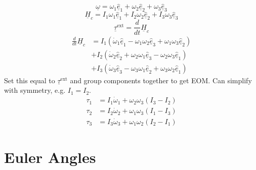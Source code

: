 \documentclass[letterpaper,twocolumn,notitlepage]{article}
\begin{document}
  \begin{equation*}
    \underline{\omega}=\omega_{1}\hat{\underline{e}}_{1}+\omega_{2}\hat{\underline{e}}_{2}+\omega_{3}\hat{\underline{e}}_{3}
  \end{equation*}
  \begin{equation*}
    \underline{H}_{c}=I_{1}\omega_{1}\hat{\underline{e}}_{1}+I_{2}\omega_{2}\hat{\underline{e}}_{2}+I_{3}\omega_{3}\hat{\underline{e}}_{3}
  \end{equation*}
  \begin{equation*}
    \underline{\tau}^{\text{ext}}=\frac{d}{dt}\underline{H}_{c}
  \end{equation*}
  \begin{equation*}
    \begin{split}
      \frac{d}{dt}\underline{H}_{c}&=I_{1}(\dot{\omega}_{1}\hat{\underline{e}}_{1}-\omega_{1}\omega_{2}\hat{\underline{e}}_{3}+\omega_{1}\omega_{3}\hat{\underline{e}}_{2}) \\
      &+I_{2}(\dot{\omega}_{2}\hat{\underline{e}}_{2}+\omega_{2}\omega_{1}\hat{\underline{e}}_{3}-\omega_{2}\omega_{3}\hat{\underline{e}}_{1}) \\
      &+I_{3}(\dot{\omega}_{3}\hat{\underline{e}}_{3}-\omega_{3}\omega_{1}\hat{\underline{e}}_{2}+\omega_{3}\omega_{2}\hat{\underline{e}}_{1})
    \end{split}
  \end{equation*}
  Set this equal to $\underline{\tau}^{\text{ext}}$ and group components together to get EOM.\@
  Can simplify with symmetry, e.g. $I_{1}=I_{2}$.
  \begin{equation*}
    \begin{split}
      \tau_{1}&=I_{1}\dot{\omega}_{1}+\omega_{2}\omega_{3}(I_{3}-I_{2}) \\
      \tau_{2}&=I_{2}\dot{\omega}_{2}+\omega_{1}\omega_{3}(I_{1}-I_{3}) \\
      \tau_{3}&=I_{3}\dot{\omega}_{3}+\omega_{1}\omega_{2}(I_{2}-I_{1})
    \end{split}
  \end{equation*}

  \section*{Euler Angles}
\end{document}

